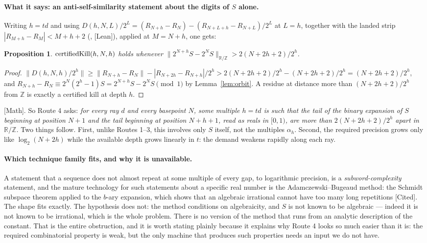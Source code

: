 \documentclass[11pt]{article}
\theoremstyle{plain}
\newtheorem{prop}[thm]{Proposition}
\theoremstyle{definition}
\theoremstyle{remark}
\newcommand{\lean}[2]{\leanlink{#2}}
\let\origmathrm\mathrm
\renewcommand{\mathrm}[1]{\ifmmode\origmathrm{#1}\else\textrm{#1}\fi}%
\newcommand{\ev}[1]{{\small\textsf{[#1]}}\xspace}
\newcommand{\Z}{\mathbb{Z}}
\newcommand{\R}{\mathbb{R}}
\begin{document}
\paragraph{What it says: an anti-self-similarity statement about the digits
of $S$ alone.}
Writing $h=td$ and using
$D(h,N,L)/2^{L}=(R_{N+h}-R_N)-(R_{N+L+h}-R_{N+L})/2^{L}$ at $L=h$, together
with the landed strip $|R_{M+h}-R_M|<M+h+2$
(\lean{Erdos249257.\allowbreak TotientTailPeriodKiller.\allowbreak abs_tail_\allowbreak diff_lt}{CarrySurvivorExtinction.lean:79},
\ev{Lean}), applied at $M=N+h$, one gets:

\begin{prop}\label{prop:route4}
$\mathrm{certifiedKill}(h,N,h)$ holds whenever
$\bigl\|2^{N+h}S-2^{N}S\bigr\|_{\R/\Z}>2(N+2h+2)/2^{h}$.
\end{prop}

\begin{proof}
$\|D(h,N,h)/2^{h}\|\ge\|R_{N+h}-R_N\|-|R_{N+2h}-R_{N+h}|/2^{h}
 >2(N+2h+2)/2^{h}-(N+2h+2)/2^{h}=(N+2h+2)/2^{h}$, and
$R_{N+h}-R_N\equiv 2^{N}(2^{h}-1)S=2^{N+h}S-2^{N}S\pmod 1$ by
Lemma~\ref{lem:orbit}. A residue at distance more than $(N+2h+2)/2^{h}$ from
$\Z$ is exactly a certified kill at depth $h$.
\end{proof}

\noindent
\ev{Math}. So Route 4 asks: \emph{for every ray $d$ and every basepoint $N$,
some multiple $h=td$ is such that the tail of the binary expansion of $S$
beginning at position $N+1$ and the tail beginning at position $N+h+1$, read
as reals in $[0,1)$, are more than $2(N+2h+2)/2^{h}$ apart in $\R/\Z$.} Two
things follow. First, unlike Routes 1--3, this involves only $S$ itself, not
the multiples $\alpha_h$. Second, the required precision grows only like
$\log_2(N+2h)$ while the available depth grows linearly in $t$: the demand
weakens rapidly along each ray.

\paragraph{Which technique family fits, and why it is unavailable.}
A statement that a sequence does not almost repeat at some multiple of every
gap, to logarithmic precision, is a \emph{subword-complexity} statement, and
the mature technology for such statements about a specific real number is the
Adamczewski--Bugeaud method: the Schmidt subspace theorem applied to the
$b$-ary expansion, which shows that an algebraic irrational cannot have too
many long repetitions \ev{Cited}. The shape fits exactly. The hypothesis does
not: the method conditions on algebraicity, and $S$ is not known to be
algebraic --- indeed it is not known to be irrational, which is the whole
problem. There is no version of the method that runs from an analytic
description of the constant. That is the entire obstruction, and it is worth
stating plainly because it explains why Route 4 looks so much easier than it
is: the required combinatorial property is weak, but the only machine that
produces such properties needs an input we do not have.
\end{document}
